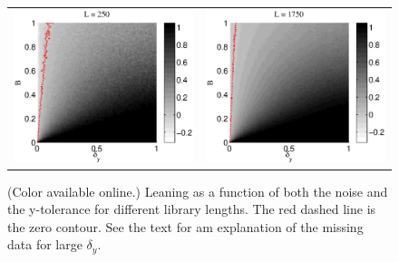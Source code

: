 \documentclass[a4paper,11pt,twocolumn]{article}
\begin{document}
\begin{figure}[ht]
\begin{tabular}{cc}
\includegraphics[scale=0.30]{SimpleIRexample_diffLpart3.eps} &
\includegraphics[scale=0.30]{SimpleIRexample_diffLpart4.eps}
\end{tabular}
\caption{(Color available online.) Leaning as a function of both the noise and the y-tolerance for different library lengths.  The red dashed line is the zero contour.  See the text for am explanation of the missing data for large $\delta_y$.}
\end{figure}
\end{document}
